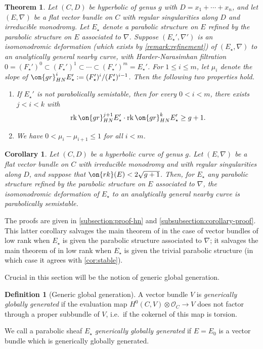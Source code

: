 \documentclass[12 pt]{amsart}
\theoremstyle{plain}
\newtheorem{theorem}[subsubsection]{Theorem}
\newtheorem{corollary}[subsubsection]{Corollary}
\theoremstyle{definition}
\newtheorem{definition}[subsubsection]{Definition}
\theoremstyle{remark}
\numberwithin{equation}{section}
\DeclareMathOperator\rk{rk}
\begin{document}
\begin{theorem}
	\label{theorem:hn-constraints-parabolic}
	Let $(C,D)$ be hyperbolic of genus $g$ with $D = x_1 + \cdots + x_n$, and let
	$({E}, \nabla)$ be a flat
vector bundle on $C$ with regular singularities along $D$ and irreducible
monodromy. Let $E_\star$ denote a parabolic structure on $E$ refined by the parabolic structure on $E$ associated to $\nabla$.
Suppose
 $(E_\star',\nabla')$ 
 is an isomonodromic deformation (which exists by \autoref{remark:refinement})
of $({E_\star}, \nabla)$ to an analytically general nearby curve,
with Harder-Narasimhan filtration $0 = (F_\star')^0 \subset (F_\star')^1 \subset \cdots \subset
(F_\star')^m =
E_\star'$. For $1 \leq i \leq m$, let $\mu_i$ denote the slope of
$\on{gr}^{i}_{HN}E_\star' := (F'_\star)^i/(F_\star')^{i-1}$.
Then the following two properties hold.
\begin{enumerate}
	\item If $E_\star'$ is not parabolically semistable, then for every $0 < i < m$, there
	exists $j < i < k$ with $$\rk \on{gr}^{j+1}_{HN}E_\star'\cdot \rk
	\on{gr}^k_{HN}E_\star'\geq g+1.$$
\item We have $0<\mu_i-\mu_{i+1}\leq 1$ for all $i<m$. 
\end{enumerate}
\end{theorem}
\begin{corollary}\label{cor:stable-parabolic}
	Let $(C, D)$ be a hyperbolic curve of genus $g$.
Let $({E}, \nabla)$ be a flat
vector bundle on $C$ with irreducible monodromy and with regular singularities 
along $D$, and suppose that
$\on{rk}(E)<2\sqrt{g+1}$. 
Then, for $E_\star$ any parabolic structure refined by the parabolic structure on $E$ associated to $\nabla$,
the isomonodromic deformation of $E_\star$
to an analytically general nearby curve is parabolically semistable. 
\end{corollary}
The proofs are given in \autoref{subsection:proof-hn} and
\autoref{subsubsection:corollary-proof}.
This latter corollary salvages the main theorem of \cite{BHH:parabolic} in the
case of vector bundles of low rank when $E_\star$ is given the parabolic
structure associated to $\nabla$; it salvages the main theorem of
\cite{BHH:logarithmic} in low rank when $E_\star$ is given the trivial parabolic structure (in which case it agrees with \autoref{cor:stable}).

Crucial in this section will be the notion of generic global generation.

\begin{definition}[Generic global generation]
	\label{definition:}
	A vector bundle $V$ is {\em generically globally generated} if the
evaluation map $H^0(C, V) \otimes \mathscr O_C \to V$ does not factor through a proper
subbundle of $V$, i.e.~if the cokernel of this map is torsion.

We call a parabolic sheaf $E_\star$ {\em generically globally generated} if $E =
E_0$ is a vector bundle which is generically globally generated.
\end{definition}
\end{document}

